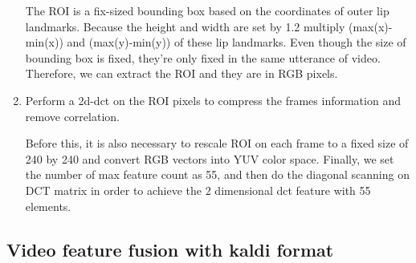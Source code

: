 \begin{enumerate}
The ROI is a fix-sized bounding box based on the coordinates of outer lip landmarks. Because the height and width are set by 1.2 multiply (max(x)-min(x)) and (max(y)-min(y)) of  these lip landmarks. Even though the size of bounding box is fixed, they’re only fixed in the same utterance of video. Therefore, we can extract the ROI and they are in RGB pixels.

\item Perform a 2d-dct on the ROI pixels to compress the frames information and remove correlation.

Before this, it is also necessary to rescale ROI on each frame to a fixed size of 240 by 240 and convert RGB vectors into YUV color space. Finally, we set the number of max feature count as 55, and then do the diagonal scanning on DCT matrix in order to achieve the 2 dimensional dct feature with 55 elements.

\end{enumerate}

\subsection{Video feature fusion with kaldi format}

